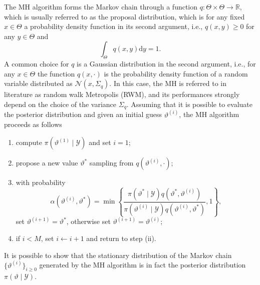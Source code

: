 \documentclass{siamart1116}
\numberwithin{theorem}{section}
\renewcommand{\theta}{\vartheta}
\newcommand{\R}{\mathbb{R}}
\newcommand{\dd}{\mathrm{d}}
\begin{document}
The MH algorithm forms the Markov chain through a function $q\colon \Theta \times \Theta \to \R$, which is usually referred to as the proposal distribution, which is for any fixed $x \in \Theta$ a probability density function in its second argument, i.e., $q(x, y) \geq 0$ for any $y \in \Theta$ and 
\begin{equation}
	\int_{\Theta} q(x, y) \dd y = 1.
\end{equation}
A common choice for $q$ is a Gaussian distribution in the second argument, i.e., for any $x \in \Theta$ the function $q(x, \cdot)$ is the probability density function of a random variable distributed as $\mathcal{N}(x, \Sigma_{q})$. In this case, the MH is referred to in literature as random walk Metropolis (RWM), and its performances strongly depend on the choice of the variance $\Sigma_{q}$. Assuming that it is possible to evaluate the posterior distribution and given an initial guess $\theta^{(i)}$, the MH algorithm proceeds as follows
\begin{enumerate}
	\item compute $\pi(\theta^{(1)}\mid \mathcal{Y})$ and set $i = 1$;
	\item propose a new value $\theta^*$ sampling from $q(\theta^{(i)}, \cdot)$;
	\item with probability 
		\begin{equation}\label{eq:AcceptanceProbability}
			\alpha(\theta^{(i)}, \theta^*) = \min\left\{\frac{\pi(\theta^*\mid\mathcal{Y})q(\theta^*, \theta^{(i)})}{\pi(\theta^{(i)}\mid\mathcal{Y})q(\theta^{(i)}, \theta^*)}, 1\right\},
		\end{equation}
		set $\theta^{(i+1)} = \theta^*$, otherwise set $\theta^{(i+1)} = \theta^{(i)}$;
	\item if $i < M$, set $i \leftarrow i + 1$ and return to step (ii).
\end{enumerate}
It is possible to show that the stationary distribution of the Markov chain $\{\theta^{(i)}\}_{i\geq 0}$ generated by the MH algorithm is in fact the posterior distribution $\pi(\theta\mid\mathcal{Y})$.
\end{document}
